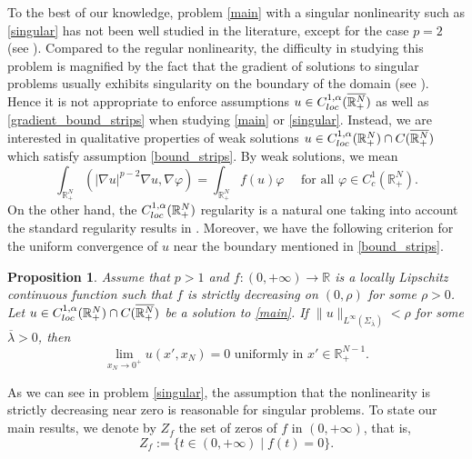 \documentclass[reqno]{amsart}
\theoremstyle{plain}
\newtheorem{proposition}[theorem]{Proposition}
\theoremstyle{definition}
\theoremstyle{remark}
\begin{document}
	To the best of our knowledge, problem \eqref{main} with a singular nonlinearity such as \eqref{singular} has not been well studied in the literature, except for the case $p=2$ (see \cite{MR4753083,2024arXiv240403343M,2024arXiv240900365L}). Compared to the regular nonlinearity, the difficulty in studying this problem is magnified by the fact that the gradient of solutions to singular problems usually exhibits singularity on the boundary of the domain (see \cite{MR1037213}). Hence it is not appropriate to enforce assumptions $u \in C^{1,\alpha}_{\rm loc}(\overline{\mathbb{R}^N_+})$ as well as \eqref{gradient_bound_strips} when studying \eqref{main} or \eqref{singular}. Instead, we are interested in qualitative properties of weak solutions $u \in C^{1,\alpha}_{\rm loc}(\mathbb{R}^N_+) \cap C(\overline{\mathbb{R}^N_+})$ which satisfy assumption \eqref{bound_strips}. By weak solutions, we mean
	\[
	\int_{\mathbb{R}^N_+} (|\nabla u|^{p-2} \nabla u, \nabla \varphi) = \int_{\mathbb{R}^N_+} f(u) \varphi \quad\text{ for all } \varphi\in C^1_c(\mathbb{R}^N_+).
	\]
	On the other hand, the $C^{1,\alpha}_{\rm loc}(\mathbb{R}^N_+)$ regularity is a natural one taking into account the standard regularity results in \cite{MR709038,MR727034,MR969499}.	
	Moreover, we have the following criterion for the uniform convergence of $u$ near the boundary mentioned in \eqref{bound_strips}.
	\begin{proposition}\label{prop:zero_convergence}
		Assume that $p>1$ and $f:(0,+\infty)\to\mathbb{R}$ is a locally Lipschitz continuous function such that $f$ is strictly decreasing on $(0,\rho)$ for some $\rho>0$.
		Let $u \in C^{1,\alpha}_{\rm loc}(\mathbb{R}^N_+) \cap C(\overline{\mathbb{R}^N_+})$ be a solution to \eqref{main}. If $\|u\|_{L^\infty(\Sigma_{\overline\lambda})} < \rho$ for some $\overline\lambda>0$, then
		\[
		\lim_{x_N\to0^+} u(x',x_N) = 0 \text{ uniformly in } x'\in\mathbb{R}^{N-1}_+.
		\]
	\end{proposition}
	As we can see in problem \eqref{singular}, the assumption that the nonlinearity is strictly decreasing near zero is reasonable for singular problems. To state our main results, we denote by $Z_f$ the set of zeros of $f$ in $(0,+\infty)$, that is,
	\[
	Z_f:=\{t\in(0,+\infty) \mid f(t)=0\}.
	\]
	
\end{document}
